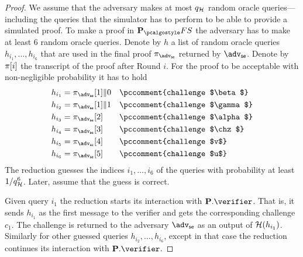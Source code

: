 \documentclass[runningheads,11pt]{llncs}
\theoremstyle{definition}
\begin{document}
\begin{proof}
	We assume that the adversary makes at most $q_{\mathcal{H}}$ random oracle
  queries---including the queries that the simulator has to perform to be able
  to provide a simulated proof. 
	To make a proof in $\plonkprotfs$ the adversary has to make at least $6$ random oracle queries. 
	Denote by $h$ a list of random oracle queries $h_{i_1}, \ldots, h_{i_6}$ that are used in the final proof $\zkproof_{\advse}$ returned by $\advse$.
	Denote by $\pi[i]$ the transcript of the proof after Round $i$. 
	For the proof to be acceptable with non-negligible probability it has to hold
	\begin{align*}
		h_{i_1} & = \zkproof_{\advse}[1] \| 0 \quad \pccomment{challenge $\beta$}\\
		h_{i_2} & = \zkproof_{\advse}[1] \| 1 \quad \pccomment{challenge $\gamma$}\\
		h_{i_3} & = \zkproof_{\advse}[2] \qquad \pccomment{challenge $\alpha$}\\
		h_{i_4} & = \zkproof_{\advse}[3] \qquad \pccomment{challenge $\chz$}\\
		h_{i_5} & = \zkproof_{\advse}[4] \qquad \pccomment{challenge $v$}\\
		h_{i_6} & = \zkproof_{\advse}[5] \qquad \pccomment{challenge $u$}
	\end{align*}
	The reduction guesses the indices $i_1, \ldots, i_6$ of the queries with probability at least $1 / q_{\mathcal{H}}^6$. Later, assume that the guess is correct.
	
	Given query $i_1$ the reduction starts its interaction with $\plonkprot.\verifier$. That is, it sends $h_{i_1}$ as the first message to the verifier and gets the corresponding challenge $c_1$. The challenge is returned to the adversary $\advse$ as an output of $\mathcal{H}(h_{i_1})$. 
	Similarly for other guessed queries $h_{i_2}, \ldots, h_{i_6}$, except in that
  case the reduction continues its interaction with $\plonkprot.\verifier$.
	

\end{proof}
\end{document}
